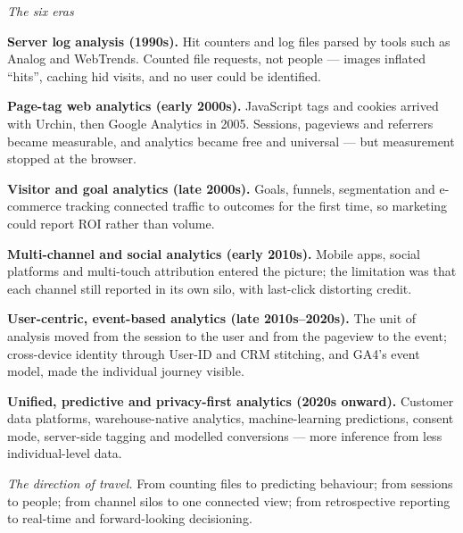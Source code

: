 \begin{qlist}
\textit{The six eras}
\begin{apts}
\item \textbf{Server log analysis (1990s).} Hit counters and log files parsed by
      tools such as Analog and WebTrends. Counted file requests, not people ---
      images inflated ``hits'', caching hid visits, and no user could be
      identified.
\item \textbf{Page-tag web analytics (early 2000s).} JavaScript tags and cookies
      arrived with Urchin, then Google Analytics in 2005. Sessions, pageviews
      and referrers became measurable, and analytics became free and universal
      --- but measurement stopped at the browser.
\item \textbf{Visitor and goal analytics (late 2000s).} Goals, funnels,
      segmentation and e-commerce tracking connected traffic to outcomes for the
      first time, so marketing could report ROI rather than volume.
\item \textbf{Multi-channel and social analytics (early 2010s).} Mobile apps,
      social platforms and multi-touch attribution entered the picture; the
      limitation was that each channel still reported in its own silo, with
      last-click distorting credit.
\item \textbf{User-centric, event-based analytics (late 2010s--2020s).} The unit
      of analysis moved from the session to the user and from the pageview to
      the event; cross-device identity through User-ID and CRM stitching, and
      GA4's event model, made the individual journey visible.
\item \textbf{Unified, predictive and privacy-first analytics (2020s onward).}
      Customer data platforms, warehouse-native analytics, machine-learning
      predictions, consent mode, server-side tagging and modelled conversions
      --- more inference from less individual-level data.
\end{apts}

\textit{The direction of travel.} From counting files to predicting behaviour;
from sessions to people; from channel silos to one connected view; from
retrospective reporting to real-time and forward-looking decisioning.


\end{qlist}
